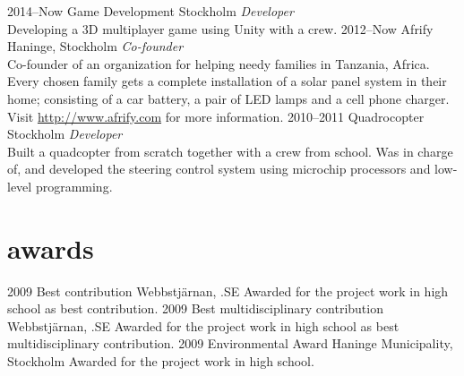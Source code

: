 \documentclass['print']{friggeri-cv} %
\begin{document}
\begin{entrylist}
\entry
{2014--Now}
{Game Development}
{Stockholm}
{\emph{Developer} \\
Developing a 3D multiplayer game using Unity with a crew.}
\entry
{2012--Now}
{Afrify}
{Haninge, Stockholm}
{\emph{Co-founder} \\
Co-founder of an organization for helping needy families in Tanzania, Africa. Every chosen family gets a complete installation of a solar panel system in their home; consisting of a car battery, a pair of LED lamps and a cell phone charger. Visit \href{http://www.afrify.com}{http://www.afrify.com} for more information.}
\entry
{2010--2011}
{Quadrocopter}
{Stockholm}
{\emph{Developer} \\
Built a quadcopter from scratch together with a crew from school. Was in charge of, and developed the steering control system using microchip processors and low-level programming.}
\end{entrylist}


\section{awards}

\begin{entrylist}
\entry
{2009}
{Best contribution}
{Webbstjärnan, .SE}
{Awarded for the project work in high school as best contribution.}
\entry
{2009}
{Best multidisciplinary contribution}
{Webbstjärnan, .SE}
{Awarded for the project work in high school as best multidisciplinary contribution.}
\entry
{2009}
{Environmental Award}
{Haninge Municipality, Stockholm}
{Awarded for the project work in high school.}
\end{entrylist}

\end{document}
